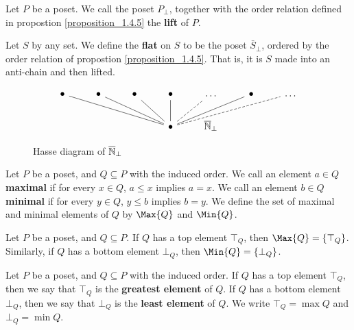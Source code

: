 \begin{definition}
  Let $P$ be a poset. We call the poset  $P_\bot$, together with the
  order relation defined in propostion \ref{proposition_1.4.5} the
  \textbf{lift} of $P$.
\end{definition}

\begin{definition}
  Let $S$ by any set. We define the \textbf{flat} on $S$ to be the
  poset $\bar{S}_\bot$, ordered by the order relation of propostion
  \ref{proposition_1.4.5}. That is, it is $S$ made into an anti-chain
  and then lifted.
\end{definition}

\begin{figure}[h]
  \centering
  \[\begin{tikzcd}
    \bullet & \bullet & \bullet & \bullet & \dots & \bullet & \dots \\
            &&& \bullet & {\bar{\N}_\bot}
            \arrow[no head, from=2-4, to=1-1]
            \arrow[no head, from=2-4, to=1-2]
            \arrow[no head, from=2-4, to=1-3]
            \arrow[no head, from=2-4, to=1-4]
            \arrow[dashed, no head, from=2-4, to=1-5]
            \arrow[draw=none, from=2-4, to=1-6]
            \arrow[no head, from=2-4, to=1-6]
            \arrow[dashed, no head, from=2-4, to=1-7]
  \end{tikzcd}\]
  \caption{Hasse diagram of $\overline{\mathbb{N}}_\bot$}
  \label{figure_1.3}
\end{figure}

\begin{definition}
  Let $P$ be a poset, and $Q \subseteq P$ with the induced order. We
  call an element $a \in Q$  \textbf{maximal} if for every $x \in Q$,
  $a \leq x$ implies $a=x$. We call an element $b \in Q$
  \textbf{minimal} if for every $y \in Q$, $y \leq b$ implies $b=y$.
  We define the set of maximal and minimal elements of $Q$ by
  $\Max{Q}$ and $\Min{Q}$.
\end{definition}

\begin{lemma}\label{lemma_1.4.6}
  Let $P$ be a poset, and  $Q \subseteq P$. If $Q$ has a top element
  $\top_Q$, then $\Max{Q}=\{\top_Q\}$. Similarly, if $Q$ has a bottom
  element $\bot_Q$, then $\Min{Q}=\{\bot_Q\}$.
\end{lemma}

\begin{definition}
  Let $P$ be a poset, and $Q \subseteq P$ with the induced order. If
  $Q$ has a top element $\top_Q$, then we say that $\top_Q$ is the
  \textbf{greatest element} of $Q$. If $Q$ has a bottom element
  $\bot_Q$, then we say that $\bot_Q$ is the \textbf{least element} of
  $Q$. We write $\top_Q=\max{Q}$ and $\bot_Q=\min{Q}$.
\end{definition}

